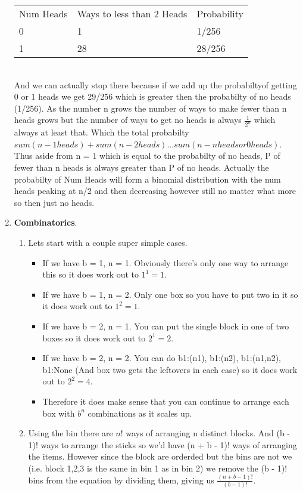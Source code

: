 \documentclass{article}
\begin{document}
\begin{enumerate}
      \begin{tabular}{lll}
      Num Heads & Ways to less than 2 Heads & Probability \\
      0         & 1                 & 1/256       \\
      1         & 28                & 28/256     
      \end{tabular} \\

      And we can actually stop there because if we add up the probabiltyof getting 0 or 1 heads we get 29/256 which is greater then the probabilty of no heads (1/256).
      As the number n grows the number of ways to make fewer than n heads grows but the number of ways to get no heads is always $\frac{1}{2^n}$ which always at least that. Which the total probabilty $sum(n - 1 heads) + sum(n - 2 heads) ... sum(n - n heads or 0 heads)$.
      Thus aside from n = 1 which is equal to the probabilty of no heads, P of fewer than n heads is always greater than P of no heads. Actually the probabilty of Num Heads will form a binomial distribution with the num heads peaking at n/2 and then decreasing however still no matter what more so then just no heads.

      \item \textbf{Combinatorics}.
      \begin{enumerate}
        \item Lets start with a couple super simple cases.
        \begin{itemize}
          \item If we have b = 1, n = 1. Obviously there's only one way to arrange this so it does work out to $1^1 = 1$.
          \item If we have b = 1, n = 2. Only one box so you have to put two in it so it does work out to $1^2 = 1$.
          \item If we have b = 2, n = 1. You can put the single block in one of two boxes so it does work out to $2^1 = 2$.
          \item If we have b = 2, n = 2. You can do {b1:(n1), b1:(n2), b1:(n1,n2), b1:None} (And box two gets the leftovers in each case) so it does work out to $2^2 = 4$.
          \item Therefore it does make sense that you can continue to arrange each box with $b^n$ combinations as it scales up.
        \end{itemize}

        \item Using the bin there are $n!$ ways of arranging n distinct blocks. And (b - 1)! ways to arrange the sticks so we'd have (n + b - 1)! ways of arranging the items.
        However since the block are orderded but the bins are not we (i.e. block 1,2,3 is the same in bin 1 as in bin 2) we remove the (b - 1)! bins from the equation by dividing them, giving us $\frac{(n + b - 1)!}{(b - 1)!}$.


\end{enumerate}
\end{enumerate}
\end{document}
